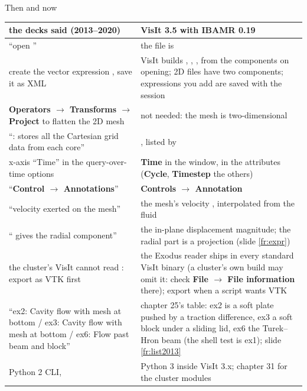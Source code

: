 \documentclass[aspectratio=169,11pt]{beamer}
\newcommand{\gui}[1]{\textsf{\textbf{#1}}}
\begin{document}
\begin{frame}{Then and now}
\label{fr:thennow}
\scriptsize
\renewcommand{\arraystretch}{0.95}
\begin{tabular}{@{}L{0.42\textwidth}L{0.51\textwidth}@{}}
\toprule
the decks said (2013--2020) & VisIt 3.5 with IBAMR 0.19 \\
\midrule
``open '' & the file is  \\
create the vector expression , save it as XML & VisIt builds , , ,  from the components on opening; 2D files have two components; expressions you add are saved with the session \\
\gui{Operators $\to$ Transforms $\to$ Project} to flatten the 2D mesh & not needed: the mesh is two-dimensional \\
``: stores all the Cartesian grid data from each core'' & , listed by  \\
x-axis ``Time'' in the query-over-time options & \gui{Time} in the window,  in the attributes (\gui{Cycle}, \gui{Timestep} the others) \\
``\gui{Control $\to$ Annotations}'' & \gui{Controls $\to$ Annotation} \\
``velocity exerted on the mesh'' & the mesh's velocity , interpolated from the fluid \\
`` gives the radial component'' & the in-plane displacement magnitude; the radial part is a projection (slide \ref{fr:expr}) \\
the cluster's VisIt cannot read : export as VTK first & the Exodus reader ships in every standard VisIt binary (a cluster's own build may omit it: check \gui{File $\to$ File information} there); export when a script wants VTK \\
``ex2: Cavity flow with mesh at bottom / ex3: Cavity flow with mesh at bottom / ex6: Flow past beam and block'' & chapter 25's table: ex2 is a soft plate pushed by a traction difference, ex3 a soft block under a sliding lid, ex6 the Turek--Hron beam (the shell test is ex1); slide \ref{fr:list2013} \\
Python 2 CLI,  & Python 3 inside VisIt 3.x; chapter 31 for the cluster modules \\
\bottomrule
\end{tabular}
\end{frame}
\end{document}

